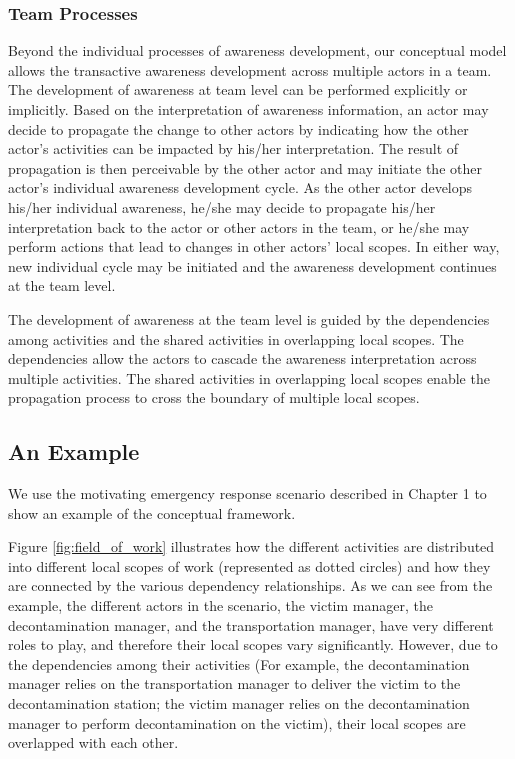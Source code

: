 
\subsubsection{Team Processes} %
\label{ssub:interactive_processes}
Beyond the individual processes of awareness development, our conceptual model allows the transactive awareness development across multiple actors in a team. The development of awareness at team level can be performed explicitly or implicitly. Based on the interpretation of awareness information, an actor may decide to propagate the change to other actors by indicating how the other actor's activities can be impacted by his/her interpretation. The result of propagation is then perceivable by the other actor and may initiate the other actor's individual awareness development cycle. As the other actor develops his/her individual awareness, he/she may decide to propagate his/her interpretation back to the actor or other actors in the team, or he/she may perform actions that lead to changes in other actors' local scopes. In either way, new individual cycle may be initiated and the awareness development continues at the team level.

The development of awareness at the team level is guided by the dependencies among activities and the shared activities in overlapping local scopes. The dependencies allow the actors to cascade the awareness interpretation across multiple activities. The shared activities in overlapping local scopes enable the propagation process to cross the boundary of multiple local scopes.

\subsection{An Example} %
\label{sub:an_example}
We use the motivating emergency response scenario described in Chapter 1 to show an example of the conceptual framework. 

Figure \ref{fig:field_of_work} illustrates how the different activities are distributed into different local scopes of work (represented as dotted circles) and how they are connected by the various dependency relationships. As we can see from the example, the different actors in the scenario, the victim manager, the decontamination manager, and the transportation manager, have very different roles to play, and therefore their local scopes vary significantly. However, due to the dependencies among their activities (For example, the decontamination manager relies on the transportation manager to deliver the victim to the decontamination station; the victim manager relies on the decontamination manager to perform decontamination on the victim), their local scopes are overlapped with each other.

